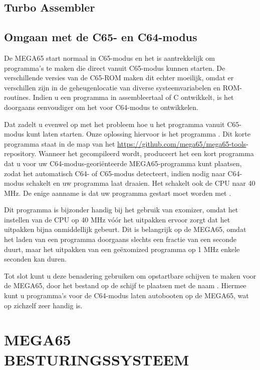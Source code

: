 \chapter{Turbo Assembler}

\chapter{Omgaan met de C65- en C64-modus}

De MEGA65 start normaal in C65-modus en het is aantrekkelijk om
programma's te maken die direct vanuit C65-modus kunnen starten. De
verschillende versies van de C65-ROM maken dit echter moeilijk, omdat er
verschillen zijn in de geheugenlocatie van diverse systeemvariabelen en ROM-
routines. Indien u een programma in assembleertaal of
C ontwikkelt, is het doorgaans eenvoudiger om het voor C64-modus te ontwikkelen.

Dat zadelt u evenwel op met het probleem hoe u het programma vanuit C65-modus kunt laten starten.
Onze oplossing hiervoor is het programma . Dit
korte programma staat in de map  van
het \url{https://github.com/mega65/mega65-tools}-repository. Wanneer
het gecompileerd wordt, produceert het een kort programma dat u voor uw
C64-modus-georiënteerde MEGA65-programma kunt plaatsen, zodat het automatisch
C64- of C65-modus detecteert, indien nodig naar C64-modus schakelt en uw
programma laat draaien. Het schakelt ook de CPU naar 40 MHz. De enige
aanname is dat uw programma gestart moet worden met
.

Dit programma is bijzonder handig bij het gebruik van exomizer, omdat het
instellen van de CPU op 40 MHz vóór het uitpakken ervoor zorgt dat het uitpakken
bijna onmiddellijk gebeurt. Dit is belangrijk op de MEGA65, omdat het laden van een
programma doorgaans slechts een fractie van een seconde duurt, maar het uitpakken van een
geëxomized programma op 1 MHz enkele seconden kan duren.

Tot slot kunt u deze benadering gebruiken om opstartbare schijven te maken voor de
MEGA65, door het bestand op de schijf te plaatsen met de
naam . Hiermee kunt u programma's voor de C64-modus
laten autobooten op de MEGA65, wat op zichzelf zeer handig is.

\part{MEGA65 BESTURINGSSYSTEEM}



